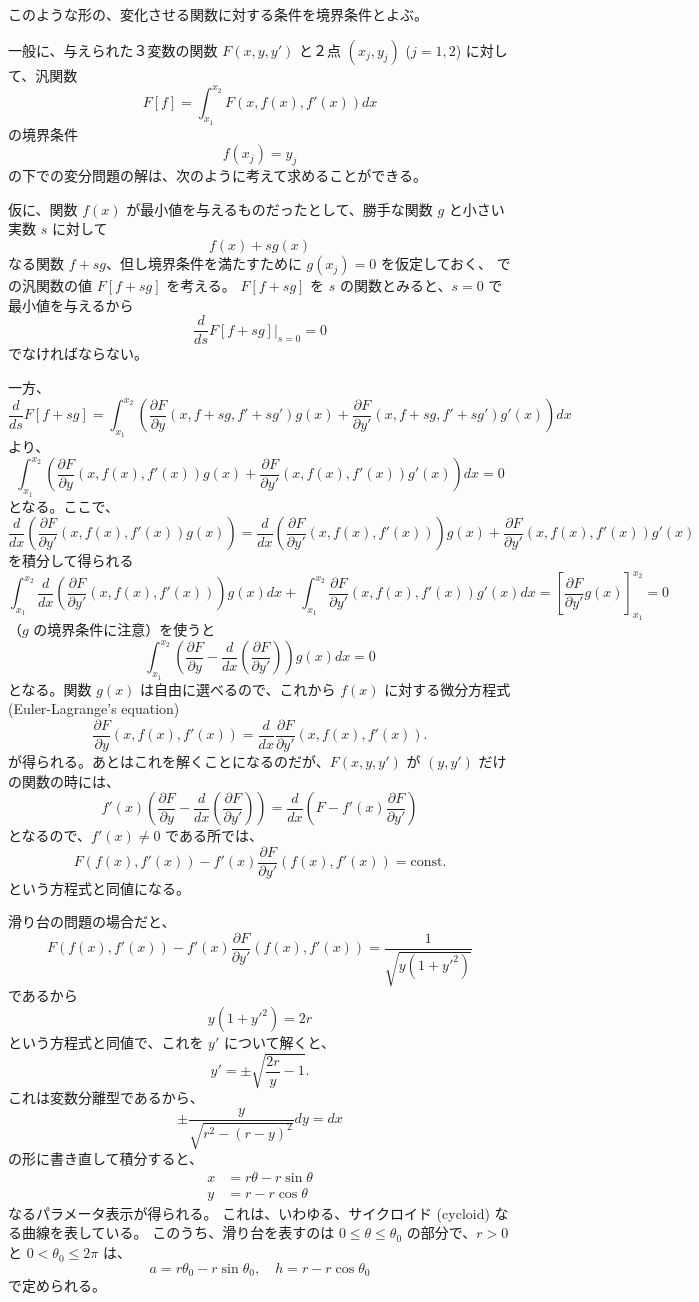 \documentclass[a4paper]{jsarticle}
\theoremstyle{definition}
\theoremstyle{remark}
\newcommand{\del}{\partial}
\begin{document}
このような形の、変化させる関数に対する条件を境界条件とよぶ。

一般に、与えられた３変数の関数 $F(x,y,y')$ と２点 
$(x_j,y_j)$ ($j=1,2$) に対して、汎関数
\[
F[f] = \int_{x_1}^{x_2} F(x, f(x), f'(x)) dx
\]
の境界条件
\[
f(x_j) = y_j
\]
の下での変分問題の解は、次のように考えて求めることができる。

仮に、関数 $f(x)$ が最小値を与えるものだったとして、勝手な関数 
$g$ と小さい実数 $s$ に対して
\[
f(x) + sg(x)
\]
なる関数 $f + sg$、但し境界条件を満たすために 
$g(x_j) = 0$ を仮定しておく、
 での汎関数の値 $F[f + sg]$ を考える。
$F[f+sg]$ を $s$ の関数とみると、$s=0$ で最小値を与えるから
\[
\frac{d}{ds} F[f+sg]|_{s=0} = 0
\]
でなければならない。

一方、
\[
\frac{d}{ds} F[f+sg] = 
\int_{x_1}^{x_2} 
\left( 
\frac{\del F}{\del y}(x,f+sg,f'+sg') g(x) + 
\frac{\del F}{\del y'}(x,f+sg,f'+sg') g'(x) \right) dx
\]
より、
\[
\int_{x_1}^{x_2} 
\left( 
\frac{\del F}{\del y}(x,f(x),f'(x)) g(x) + 
\frac{\del F}{\del y'}(x,f(x),f'(x)) g'(x) \right) dx
=0 
\]
となる。ここで、
\[
\frac{d}{dx} 
\left( 
\frac{\del F}{\del y'}(x,f(x), f'(x)) g(x) 
\right) 
= \frac{d}{dx} \left( \frac{\del F}{\del y'}(x,f(x),f'(x)) \right) g(x) + 
\frac{\del F}{\del y'}(x,f(x),f'(x)) g'(x)
\]
を積分して得られる
\[
\int_{x_1}^{x_2} 
\frac{d}{dx} \left( \frac{\del F}{\del y'}(x,f(x),f'(x)) \right) g(x) dx 
+ \int_{x_1}^{x_2} \frac{\del F}{\del y'}(x,f(x),f'(x)) g'(x) dx 
= \left[ \frac{\del F}{\del y'} g(x) \right]_{x_1}^{x_2} = 0
\]
（$g$ の境界条件に注意）を使うと
\[
\int_{x_1}^{x_2} 
\left( \frac{\del F}{\del y} - \frac{d}{dx} 
\left( \frac{\del F}{\del y'} \right) \right) 
g(x) dx = 0 
\]
となる。関数 $g(x)$ は自由に選べるので、これから $f(x)$ に対する微分方程式
(Euler-Lagrange's equation)
\[
\frac{\del F}{\del y}(x,f(x),f'(x)) = \frac{d}{dx} 
\frac{\del F}{\del y'}(x,f(x),f'(x)). 
\]
が得られる。あとはこれを解くことになるのだが、$F(x,y,y')$ が 
$(y,y')$ だけの関数の時には、
\[
f'(x) 
\left( 
\frac{\del F}{\del y} - \frac{d}{dx} 
\left( \frac{\del F}{\del y'} \right) 
\right) = \frac{d}{dx} 
\left( F - f'(x) \frac{\del F}{\del y'} \right) 
\]
となるので、$f'(x) \not= 0$ である所では、
\[
F(f(x),f'(x)) - f'(x) \frac{\del F}{\del y'}(f(x),f'(x)) = 
\text{const.}
\]
という方程式と同値になる。

滑り台の問題の場合だと、
\[
F(f(x),f'(x)) - f'(x) \frac{\del F}{\del y'}(f(x),f'(x)) = 
\frac{1}{\sqrt{y(1+{y'}^2)}}
\]
であるから
\[
y(1+{y'}^2) = 2r
\]
という方程式と同値で、これを $y'$ について解くと、
\[
y' = \pm\sqrt{\frac{2r}{y} - 1}.
\]
これは変数分離型であるから、
\[
\pm\frac{y}{\sqrt{r^2 - (r-y)^2}} dy = dx
\]
の形に書き直して積分すると、
\begin{align*}
x &= r\theta - r\sin\theta\\
y &= r - r\cos \theta
\end{align*}
なるパラメータ表示が得られる。
これは、いわゆる、サイクロイド (cycloid) なる曲線を表している。
このうち、滑り台を表すのは $0 \leq \theta \leq \theta_0$ の部分で、$r> 0$ と $0 < \theta_0 \leq 2\pi$ は、
\[
a = r\theta_0 -r\sin\theta_0, 
\quad 
h = r - r\cos\theta_0 
\]
で定められる。
\end{document}

